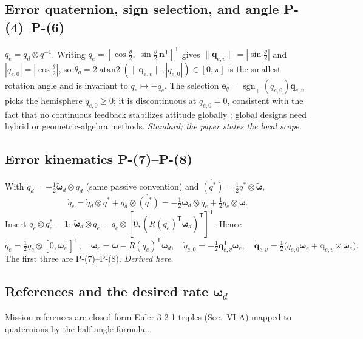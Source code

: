 \documentclass[11pt]{article}
\newcommand{\srcroot}{../..}
\newcommand{\T}{^{\mathsf T}}
\newcommand{\sgnp}{\operatorname{sgn}_{+}}
\newcommand{\Peq}[1]{P-(#1)}
\newcommand{\code}[1]{\path{#1}}
\theoremstyle{remark}
\newcommand{\listing}[4]{%
  \Needspace{8\baselineskip}%
  }
\begin{document}
\subsection{Error quaternion, sign selection, and angle \Peq{4}--\Peq{6}}
$q_e=q_d\otimes q^{-1}$. Writing $q_e=[\cos\frac\theta2,\ \sin\frac\theta2\,\bm n\T]\T$ gives
$\|\bm q_{e,v}\|=|\sin\frac\theta2|$ and $|q_{e,0}|=|\cos\frac\theta2|$, so
$\theta_q=2\operatorname{atan2}(\|\bm q_{e,v}\|,|q_{e,0}|)\in[0,\pi]$ is the smallest rotation angle and is invariant to
$q_e\mapsto-q_e$. The selection $\bm e_q=\sgnp(q_{e,0})\bm q_{e,v}$ picks the hemisphere $q_{e,0}\ge0$; it is
discontinuous at $q_{e,0}=0$, consistent with the fact that no continuous feedback stabilizes attitude globally
\cite{bhat2000topological,chaturvedi2011rigid}; global designs need hybrid \cite{mayhew2011hybrid} or geometric-algebra
\cite{rubioscola2026ga} methods. \emph{Standard; the paper states the local scope.}
\listing{src/gra_control/math3d.py}{40}{51}{$q_e=q_d\otimes q^*$, $\sgnp$ (\code{if qe[0] < 0}), $\theta_q$}

\subsection{Error kinematics \Peq{7}--\Peq{8}}
With $\dot q_d=-\tfrac12\tilde{\bm\omega}_d\otimes q_d$ (same passive convention) and $\dot{(q^*)}=\tfrac12 q^*\otimes\tilde{\bm\omega}$,
\[
\dot q_e=\dot q_d\otimes q^*+q_d\otimes\dot{(q^*)}=-\tfrac12\tilde{\bm\omega}_d\otimes q_e+\tfrac12 q_e\otimes\tilde{\bm\omega}.
\]
Insert $q_e\otimes q_e^*=1$: $\tilde{\bm\omega}_d\otimes q_e=q_e\otimes[0,(R(q_e)\T\bm\omega_d)\T]\T$. Hence
\begin{equation}
\dot q_e=\tfrac12q_e\otimes[0,\bm\omega_e\T]\T,\quad \bm\omega_e=\bm\omega-R(q_e)\T\bm\omega_d,\quad
\dot q_{e,0}=-\tfrac12\bm q_{e,v}\T\bm\omega_e,\quad
\dot{\bm q}_{e,v}=\tfrac12\big(q_{e,0}\bm\omega_e+\bm q_{e,v}\times\bm\omega_e\big).
\label{eq:qev_dot}
\end{equation}
The first three are \Peq{7}--\Peq{8}. \emph{Derived here.}

\subsection{\texorpdfstring{References and the desired rate $\bm\omega_d$}{References and the desired rate}}\label{sec:rate}
Mission references are closed-form Euler 3-2-1 triples (Sec.~VI-A) mapped to quaternions by the half-angle formula
\cite{diebel2006quaternion}.
\listing{src/gra_control/math3d.py}{28}{37}{Euler 3-2-1 to quaternion}
\listing{src/gra_control/math3d.py}{54}{82}{mission references (Roll, Full3, Hard45, Hardstep, Yaw360; Hover)}
\end{document}
